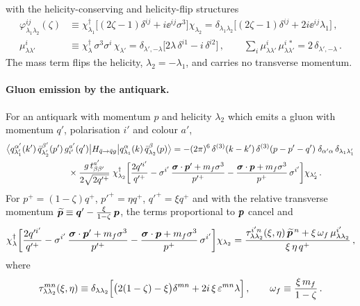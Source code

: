 with the helicity-conserving and helicity-flip structures
\begin{align}
\varphi^{ij}_{\lambda_1\lambda_2}(\zeta)&\equiv
\chi^\dagger_{\lambda_1}\big[(2\zeta-1)\delta^{ij}+i\ee^{ij}\sigma^3\big]\chi_{\lambda_2}
=\delta_{\lambda_1\lambda_2}\big[(2\zeta-1)\delta^{ij}+2i\ee^{ij}\lambda_1\big]\,,
\label{eq:phi}\\
\mu^i_{\lambda\lambda'}&\equiv\chi^\dagger_\lambda\,\sigma^3\sigma^i\,\chi_{\lambda'}
=\delta_{\lambda',-\lambda}\big[2\lambda\,\delta^{i1}-i\,\delta^{i2}\big]\,,
\qquad \sum_{i}\mu^i_{\lambda\lambda'}\,\mu^{i\,*}_{\lambda\lambda'}=2\,\delta_{\lambda',-\lambda}\,.
\label{eq:mu}
\end{align}
The mass term flips the helicity, $\lambda_2=-\lambda_1$, and carries no transverse momentum.

\paragraph{Gluon emission by the antiquark.} For an antiquark with momentum $p$ and helicity
$\lambda_2$ which emits a gluon with momentum $q'$, polarisation $i'$ and colour $a'$,
\begin{align}
&\big\langle q^{\alpha'}_{\lambda_1'}(k')\,\bar q^{\beta'}_{\lambda_2'}(p')\,g^{a'}_{i'}(q')\big|
H_{\bar q\to\bar qg}\big|q^\alpha_{\lambda_1}(k)\,\bar q^\beta_{\lambda_2}(p)\big\rangle
=-(2\pi)^6\,\delta^{(3)}(k-k')\,\delta^{(3)}(p-p'-q')\;\delta_{\alpha'\alpha}\,\delta_{\lambda_1\lambda_1'}
\nonumber\\
&\hspace{2.5cm}\times\frac{g\,t^{a'}_{\beta\beta'}}{2\sqrt{2q'^+}}\;
\chi^\dagger_{\lambda_2}\bigg[\frac{2q'^{i'}}{q'^+}
-\sigma^{i'}\,\frac{\bm\sigma\cdot\bm{p}'+m_f\sigma^3}{p'^+}
-\frac{\bm\sigma\cdot\bm{p}+m_f\sigma^3}{p^+}\,\sigma^{i'}\bigg]\chi_{\lambda_2'}\,.
\label{eq:Hg}
\end{align}
For $p^+=(1-\zeta)q^+$, $p'^+=\eta q^+$, $q'^+=\xi q^+$ and with the relative transverse momentum
$\widetilde{\bm{p}}\equiv\bm{q}'-\frac{\xi}{1-\zeta}\,\bm{p}$, the terms proportional to $\bm{p}$ cancel and
\begin{equation}
\chi^\dagger_{\lambda}\bigg[\frac{2q'^{i'}}{q'^+}
-\sigma^{i'}\,\frac{\bm\sigma\cdot\bm{p}'+m_f\sigma^3}{p'^+}
-\frac{\bm\sigma\cdot\bm{p}+m_f\sigma^3}{p^+}\,\sigma^{i'}\bigg]\chi_{\lambda_2}
=\frac{\tau^{i'n}_{\lambda\lambda_2}(\xi,\eta)\,\widetilde{\bm{p}}^{\,n}+\xi\,\omega_f\,\mu^{i'}_{\lambda\lambda_2}}{\xi\,\eta\,q^+}\,,
\label{eq:Hg2}
\end{equation}
where
\begin{equation}
\tau^{mn}_{\lambda\lambda_2}(\xi,\eta)\equiv\delta_{\lambda\lambda_2}\Big[\big(2(1-\zeta)-\xi\big)\delta^{mn}
+2i\,\xi\,\varepsilon^{mn}\lambda\Big]\,,\qquad
\omega_f\equiv\frac{\xi\,m_f}{1-\zeta}\,.
\label{eq:tau}
\end{equation}
